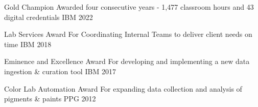 

\begin{cvhonors}

  \cvhonor
    {Gold Champion} %
    {Awarded four consecutive years - 1,477 classroom hours and 43 digital credentials} %
    {IBM} %
    {2022} %

  \cvhonor
    {Lab Services Award} %
    {For Coordinating Internal Teams to deliver client needs on time} %
    {IBM} %
    {2018} %

  \cvhonor
    {Eminence and Excellence Award} %
    {For developing and implementing a new data ingestion \& curation tool} %
    {IBM} %
    {2017} %

  \cvhonor
    {Color Lab Automation Award} %
    {For expanding data collection and analysis of pigments \& paints}
    {PPG} %
    {2012} %

\end{cvhonors}
